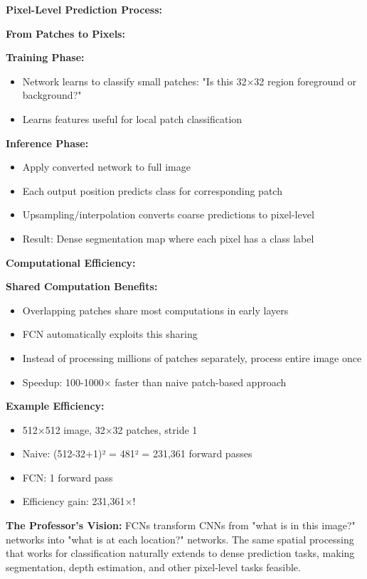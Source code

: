 \documentclass[12pt]{article}
\newcommand{\explanation}[1]{{\color{explanationcolor}#1}}
\begin{document}
\begin{enumerate}[(a)]
{    \textbf{Pixel-Level Prediction Process:}
    
    \explanation{
    \textbf{From Patches to Pixels:}
    
    \textbf{Training Phase:}
    \begin{itemize}
        \item Network learns to classify small patches: "Is this 32×32 region foreground or background?"
        \item Learns features useful for local patch classification
    \end{itemize}
    
    \textbf{Inference Phase:}
    \begin{itemize}
        \item Apply converted network to full image
        \item Each output position predicts class for corresponding patch
        \item Upsampling/interpolation converts coarse predictions to pixel-level
        \item Result: Dense segmentation map where each pixel has a class label
    \end{itemize}
    }
    
    \textbf{Computational Efficiency:}
    
    \explanation{
    \textbf{Shared Computation Benefits:}
    \begin{itemize}
        \item Overlapping patches share most computations in early layers
        \item FCN automatically exploits this sharing
        \item Instead of processing millions of patches separately, process entire image once
        \item Speedup: 100-1000× faster than naive patch-based approach
    \end{itemize}
    
    \textbf{Example Efficiency:}
    \begin{itemize}
        \item 512×512 image, 32×32 patches, stride 1
        \item Naive: (512-32+1)² = 481² = 231,361 forward passes
        \item FCN: 1 forward pass
        \item Efficiency gain: 231,361×!
    \end{itemize}
    }
    
    \textbf{The Professor's Vision:}
    \explanation{
    FCNs transform CNNs from "what is in this image?" networks into "what is at each location?" networks. The same spatial processing that works for classification naturally extends to dense prediction tasks, making segmentation, depth estimation, and other pixel-level tasks feasible.
    }
    }
\end{enumerate}
\end{document}
